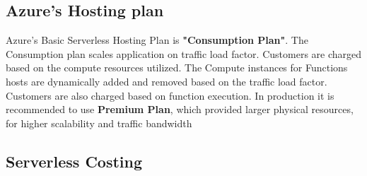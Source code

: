 \documentclass{article}
\begin{document}
\subsection{Azure's Hosting plan}
Azure's Basic Serverless Hosting Plan is \textbf{"Consumption Plan"}. The Consumption plan scales application on traffic load factor. Customers are charged based on the compute resources utilized. The Compute instances for Functions hosts are dynamically added and removed based on the traffic load factor. Customers are also charged based on function execution.
In production it is recommended to use \textbf{Premium Plan}, which provided larger physical resources, for higher scalability and traffic bandwidth

\subsection{Serverless Costing}
\end{document}
